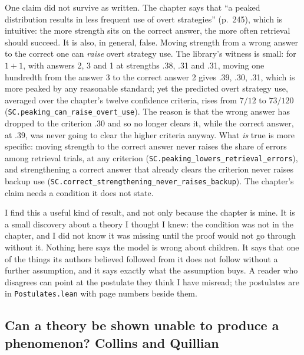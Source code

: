 \documentclass[11pt]{article}
\newcommand{\code}[1]{\texttt{#1}}
\newcommand{\lean}[1]{\texttt{#1}}
\begin{document}
One claim did not survive as written. The chapter says that ``a peaked
distribution results in less frequent use of overt strategies''
(p.~245), which is intuitive: the more strength sits on the correct
answer, the more often retrieval should succeed. It is also, in
general, false. Moving strength from a wrong answer to the correct one
can \emph{raise} overt strategy use. The library's witness is small:
for $1+1$, with answers 2, 3 and 1 at strengths .38, .31 and .31,
moving one hundredth from the answer 3 to the correct answer 2 gives
.39, .30, .31, which is more peaked by any reasonable standard; yet the
predicted overt strategy use, averaged over the chapter's twelve
confidence criteria, rises from $7/12$ to $73/120$
(\lean{SC.peaking\_can\_raise\_overt\_use}). The reason is that the
wrong answer has dropped to the criterion .30 and so no longer clears
it, while the correct answer, at .39, was never going to clear the
higher criteria anyway. What \emph{is} true is more specific: moving
strength to the correct answer never raises the share of errors among
retrieval trials, at any criterion
(\lean{SC.peaking\_lowers\_retrieval\_errors}), and strengthening a
correct answer that already clears the criterion never raises backup
use (\lean{SC.correct\_strengthening\_never\_raises\_backup}). The
chapter's claim needs a condition it does not state.

I find this a useful kind of result, and not only because the chapter
is mine. It is a small discovery about a theory I thought I knew: the
condition was not in the chapter, and I did not know it was missing
until the proof would not go through without it. Nothing here says
the model is wrong about children. It says
that one of the things its authors believed followed from it does not
follow without a further assumption, and it says exactly what the
assumption buys. A reader who disagrees can point at the postulate they
think I have misread; the postulates are in \code{Postulates.lean} with
page numbers beside them.

\subsection{Can a theory be shown unable to produce a phenomenon? Collins and Quillian}
\label{sec:cq}
\end{document}
